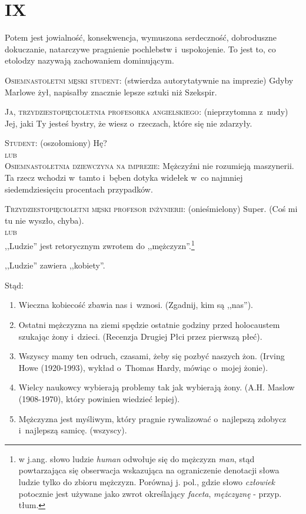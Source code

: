 \documentclass[oneside,polish,12pt,sfheadings]{mwbk}
\begin{document}
\chapter{IX}

Potem jest jowialność, konsekwencja, wymuszona serdeczność, dobroduszne
dokuczanie, natarczywe pragnienie pochlebstw i~uspokojenie. To jest to,
co etolodzy nazywają zachowaniem dominującym.

\textsc{Osiemnastoletni męski student}: (stwierdza autorytatywnie na imprezie)
Gdyby Marlowe żył, napisałby znacznie lepsze sztuki niż Szekspir.

\textsc{Ja, trzydziestopięcioletnia profesorka angielskiego}: (nieprzytomna
z~nudy) Jej, jaki Ty jesteś bystry, że wiesz o~rzeczach, które się
nie zdarzyły.

\textsc{Student}: (oszołomiony) Hę? \\

\textsc{lub}\\


\textsc{Osiemnastoletnia dziewczyna na imprezie}: Mężczyźni nie rozumieją maszynerii.
Ta rzecz wchodzi w~tamto i~bęben dotyka widełek w~co najmniej siedemdziesięciu
procentach przypadków.

\textsc{Trzydziestopięcioletni męski profesor inżynierii}: (onieśmielony) Super.
(Coś mi tu nie wyszło, chyba).\\

\textsc{lub}\\


,,Ludzie'' jest retorycznym zwrotem do ,,mężczyzn''.\footnote{w j.ang. słowo ludzie \textit{human} odwołuje się do mężczyzn \textit{man}, stąd powtarzająca się obserwacja wskazująca na ograniczenie denotacji słowa ludzie tylko do zbioru mężczyzn. Porównaj j. pol., gdzie słowo \textit{człowiek} potocznie jest używane jako zwrot określający \textit{faceta}, \textit{mężczyznę} - przyp. tłum.}

,,Ludzie'' zawiera ,,kobiety''. 

Stąd: 

\begin{enumerate}
\item Wieczna kobiecość zbawia nas i~wznosi. (Zgadnij, kim są ,,nas'').
\item Ostatni mężczyzna na ziemi spędzie ostatnie godziny przed holocaustem
szukając żony i~dzieci. (Recenzja Drugiej Płci przez pierwszą płeć).
\item Wszyscy mamy ten odruch, czasami, żeby się pozbyć naszych żon.
(Irving Howe (1920-1993), wykład o~Thomas Hardy, mówiąc o~mojej żonie).
\item  Wielcy naukowcy wybierają problemy tak jak wybierają żony. (A.H. Maslow (1908-1970), który powinien wiedzieć lepiej).

\item Mężczyzna jest myśliwym, który pragnie rywalizować o~najlepszą
zdobycz i~najlepszą samicę. (wszyscy).\\
\end{enumerate}
\end{document}
